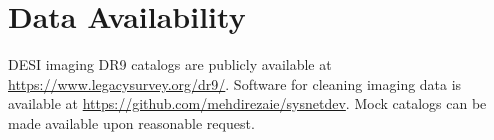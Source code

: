 \section*{Data Availability}
\label{sec:dataavail}
DESI imaging DR9 catalogs are publicly available at \href{https://www.legacysurvey.org/dr9/}{https://www.legacysurvey.org/dr9/}. Software for cleaning imaging data is available at \href{https://github.com/mehdirezaie/sysnetdev}{https://github.com/mehdirezaie/sysnetdev}. Mock catalogs can be made available upon reasonable request.